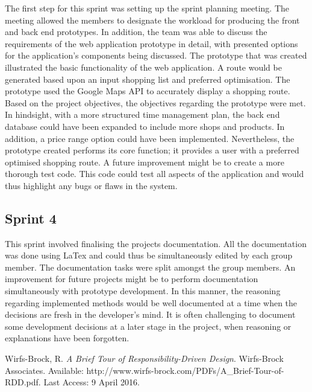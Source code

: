 \documentclass[10pt,twocolumn]{witseiepaper}
\begin{document}
		The first step for this sprint was setting up the sprint planning meeting. The meeting allowed the members to designate the workload for producing the front and back end prototypes. In addition, the team was able to discuss the requirements of the web application prototype in detail, with presented options for the application's components being discussed. The prototype that was created illustrated the basic functionality of the web application. A route would be generated based upon an input shopping list and preferred optimisation.  The prototype used the Google Maps API to accurately display a shopping route. Based on the project objectives, the objectives regarding the prototype were met. In hindsight, with a more structured time management plan, the back end database could have been expanded to include more shops and products. In addition, a price range option could have been implemented. Nevertheless, the prototype created performs its core function; it provides a user with a preferred optimised shopping route. A future improvement might be to create a more thorough test code. This code could test all aspects of the application and would thus highlight any bugs or flaws in the system. 
		
		\subsection{Sprint 4}	
		
		This sprint involved finalising the projects documentation. All the documentation was done using LaTex and could thus be simultaneously edited by each group member. The documentation tasks were split amongst the group members. An improvement for future projects might be to perform documentation simultaneously with prototype development. In this manner, the reasoning regarding implemented methods would be well documented at a time when the decisions are fresh in the developer's mind. It is often challenging to document some development decisions at a later stage in the project, when reasoning or explanations have been forgotten. 

\newpage

\begin{thebibliography}{1}
	 Wirfs-Brock, R. \textit{A Brief Tour of Responsibility-Driven Design}. Wirfs-Brock Associates. Available: http://www.wirfs-brock.com/PDFs/A\_Brief-Tour-of-RDD.pdf. Last Access: 9 April 2016.
\end{thebibliography}	
\end{document}
